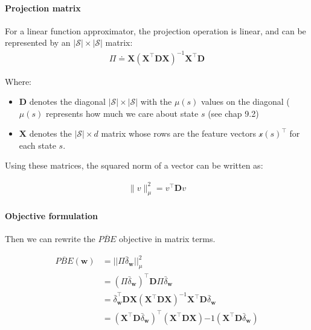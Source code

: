 \documentclass[sutton_barto_notes.tex]{subfiles}
\begin{document}
\paragraph{Projection matrix}
 
For a linear function approximator, the projection operation is linear, and can be represented by an $|\mathcal{S}| \times |\mathcal{S}|$ matrix: 
\begin{align}
\Pi \doteq \mathbf{X} (\mathbf{X}^{\top} \mathbf{D} \mathbf{X})^{-1} \mathbf{X}^{\top} \mathbf{D} \label{eq:11.21}\tag{11.21}
\end{align}

 Where: 
\begin{itemize}
\item $\mathbf{D}$ denotes the diagonal $|\mathcal{S}| \times |\mathcal{S}|$ with the $\mu(s)$ values on the diagonal ($\mu(s)$ represents how much we care about state $s$ (see chap 9.2)
\item $\mathbf{X}$ denotes the $|\mathcal{S}| \times d$ matrix whose rows are the feature vectors $\mathcal{x}(s)^{\top}$ for each state $s$. 
\end{itemize}

 Using these matrices, the squared norm of a vector can be written as: 

\begin{align}
\|v\|_{\mu}^2 = v^{\top} \mathbf{D} v \label{eq:11.22}\tag{11.22}
\end{align}

\paragraph{Objective formulation}  
Then we can rewrite the $\overline{PBE}$ objective in matrix terms. 

 
\begin{align}
\overline{PBE}(\mathbf{w}) & = ||\Pi \bar{\delta}_{\mathbf{w}}||^2_{\mu} \label{eq:11.23}\tag{11.23}\\
 & = (\Pi \bar{\delta}_{\mathbf{w}})^{\top} \mathbf{D} \Pi \bar{\delta}_{\mathbf{w}} \label{eq:11.24}\tag{11.24}\\
 & = \bar{\delta}^{\top}_{\mathbf{w}} \mathbf{D} \mathbf{X} (\mathbf{X}^{\top} \mathbf{D} \mathbf{X})^{-1} \mathbf{X}^{\top} \mathbf{D} \bar{\delta}_{\mathbf{w}} \label{eq:11.25}\tag{11.25}\\
 & = (\mathbf{X}^{\top} \mathbf{D} \bar{\delta}_{\mathbf{w}})^{\top} (\mathbf{X}^{\top} \mathbf{D} \mathbf{X}){-1} (\mathbf{X}^{\top} \mathbf{D} \bar{\delta}_{\mathbf{w}}) \label{eq:11.26}\tag{11.26}
\end{align} 
\end{document}
